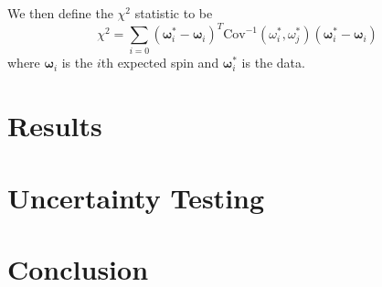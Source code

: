 \documentclass[11pt]{article}
\begin{document}
We then define the $\chi^2$ statistic to be
\begin{equation}
\chi^2 = \sum_{i=0} (\bm \omega_i^* - \bm \omega_i)^T\text{Cov}^{-1}(\omega^*_i, \omega^*_j)(\bm \omega_i^* - \bm \omega_i)
\end{equation}
where $\bm \omega_i$ is the $i$th expected spin and $\bm \omega_i^*$ is the data.



\section{Results}

\section{Uncertainty Testing}

\section{Conclusion}



\end{document}
